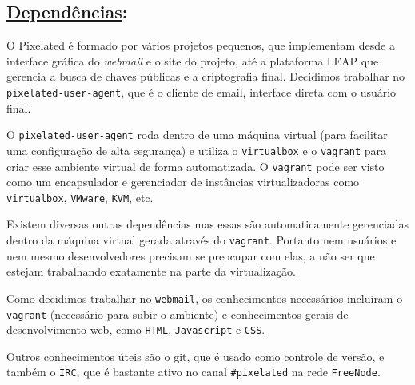 \subsection*{\underline{Dependências}:}

O Pixelated é formado por vários projetos pequenos, que implementam desde a
interface gráfica do \emph{webmail} e o site do projeto, até a plataforma LEAP
que gerencia a busca de
chaves públicas e a criptografia final. Decidimos trabalhar no
\texttt{pixelated-user-agent}, que é o cliente de email, interface direta com o
usuário final.

O \texttt{pixelated-user-agent} roda dentro de uma máquina virtual (para facilitar
uma configuração de alta segurança) e utiliza o \texttt{virtualbox} e o
\texttt{vagrant} para criar esse ambiente virtual de forma automatizada.
O \texttt{vagrant} pode ser visto como um encapsulador e gerenciador de
instâncias virtualizadoras como \texttt{virtualbox}, \texttt{VMware},
\texttt{KVM}, etc.

Existem diversas outras dependências mas essas são automaticamente gerenciadas
dentro da máquina virtual gerada através do \texttt{vagrant}. Portanto nem
usuários e nem
mesmo desenvolvedores precisam se preocupar com elas, a não ser que estejam
trabalhando exatamente na parte da virtualização.

Como decidimos trabalhar no \texttt{webmail}, os conhecimentos necessários
incluíram o \texttt{vagrant} (necessário para subir o ambiente) e conhecimentos
gerais de
desenvolvimento web, como \texttt{HTML}, \texttt{Javascript} e \texttt{CSS}.

Outros conhecimentos úteis são o git, que é usado como controle de versão,
e também o \texttt{IRC}, que é bastante ativo no canal \texttt{\#pixelated} na rede
\texttt{FreeNode}.